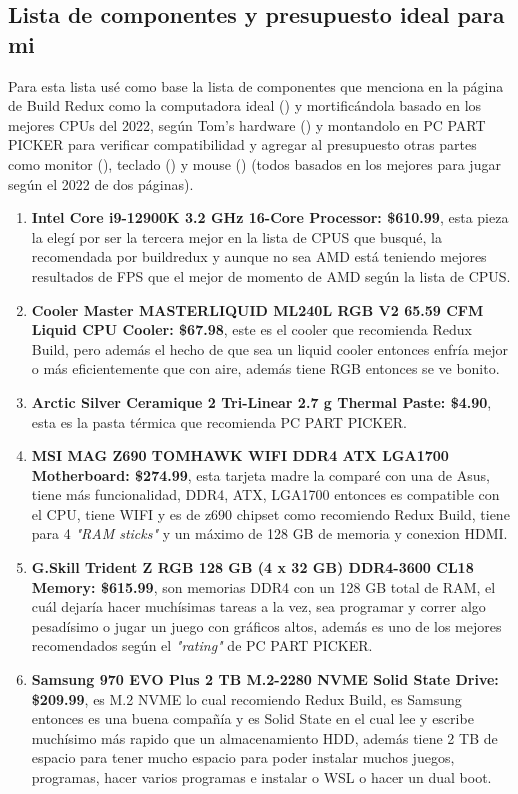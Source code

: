 \documentclass[12pt, a4paper]{article}
\begin{document}
\subsection{Lista de componentes y presupuesto ideal para mi}
Para esta lista usé como base la lista de componentes que menciona en la página de Build Redux como la computadora ideal (\cite{buildredux}) y mortificándola basado en los mejores CPUs del 2022, según Tom's hardware (\cite{bestCPUS2022}) y montandolo en PC PART PICKER para verificar compatibilidad y agregar al presupuesto otras partes como monitor (\cite{bestMonitors2022}), teclado (\cite{bestKeyboards2022}) y mouse (\cite{bestMouses2022}) (todos basados en los mejores para jugar según el 2022 de dos páginas).
\begin{enumerate}
    \item \textbf{Intel Core i9-12900K 3.2 GHz 16-Core Processor: \$610.99}, esta pieza la elegí por ser la tercera mejor en la lista de CPUS que busqué, la recomendada por buildredux y aunque no sea AMD está teniendo mejores resultados de FPS que el mejor de momento de AMD según la lista de CPUS.
    \item \textbf{Cooler Master MASTERLIQUID ML240L RGB V2 65.59 CFM Liquid CPU Cooler: \$67.98}, este es el cooler que recomienda Redux Build, pero además el hecho de que sea un liquid cooler entonces enfría mejor o más eficientemente que con aire, además tiene RGB entonces se ve bonito.
    \item \textbf{ 	Arctic Silver Ceramique 2 Tri-Linear 2.7 g Thermal Paste: \$4.90}, esta es la pasta térmica que recomienda PC PART PICKER.
    \item \textbf{MSI MAG Z690 TOMHAWK WIFI DDR4 ATX LGA1700 Motherboard: \$274.99}, esta tarjeta madre la comparé con una de Asus, tiene más funcionalidad, DDR4, ATX, LGA1700 entonces es compatible con el CPU, tiene WIFI y es de z690 chipset como recomiendo Redux Build, tiene para 4 \textit{"RAM sticks"} y un máximo de 128 GB de memoria y conexion HDMI.
    \item \textbf{G.Skill Trident Z RGB 128 GB (4 x 32 GB) DDR4-3600 CL18 Memory: \$615.99}, son memorias DDR4 con un 128 GB total de RAM, el cuál dejaría hacer muchísimas tareas a la vez, sea programar y correr algo pesadísimo o jugar un juego con gráficos altos, además es uno de los mejores recomendados según el \textit{"rating"} de PC PART PICKER.
    \item \textbf{Samsung 970 EVO Plus 2 TB M.2-2280 NVME Solid State Drive: \$209.99}, es M.2 NVME lo cual recomiendo Redux Build, es Samsung entonces es una buena compañía y es Solid State en el cual lee y escribe muchísimo más rapido que un almacenamiento HDD, además tiene 2 TB de espacio para tener mucho espacio para poder instalar muchos juegos, programas, hacer varios programas e instalar o WSL o hacer un dual boot.

\end{enumerate}
\end{document}
